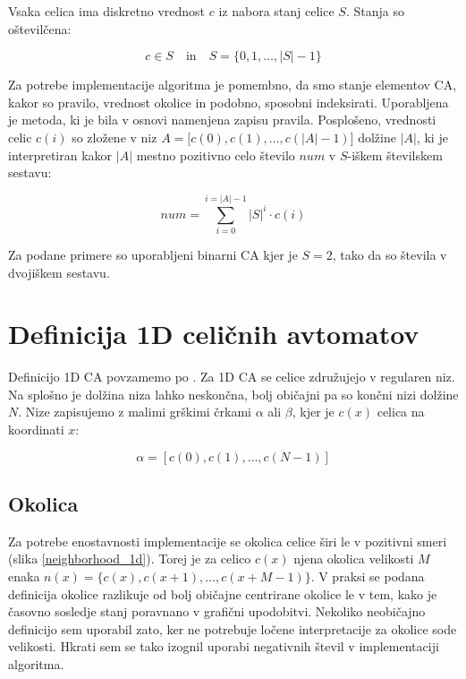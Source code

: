 \documentclass[12pt,a4paper,openany,twoside]{book}
\begin{document}
Vsaka celica ima diskretno vrednost \(c\) iz nabora stanj celice \(S\).
Stanja so oštevilčena:

\begin{equation}
c \in S
\quad \textrm{in} \quad
S = \{ 0, 1, \ldots, |S|-1 \}
\end{equation}

Za potrebe implementacije algoritma je pomembno,
da smo stanje elementov CA, kakor so pravilo, vrednost okolice in podobno,
sposobni indeksirati.
Uporabljena je metoda, ki je bila v osnovi namenjena zapisu pravila.
Posplošeno, vrednosti celic \(c(i)\) so zložene v niz \(A=[c(0),c(1), \ldots, c(|A|-1)\)] dolžine \(|A|\),
ki je interpretiran kakor \(|A|\) mestno pozitivno celo število \(num\) v
\(S\)-iškem številskem sestavu:

\begin{equation}
num = \sum_{i=0}^{i=|A|-1} |S|^i \cdot c(i)
\end{equation}

Za podane primere so uporabljeni binarni CA kjer je \(S=2\),
tako da so števila v dvojiškem sestavu.

\section{Definicija 1D celičnih avtomatov}

Definicijo 1D CA povzamemo po \cite{JerasDobnikar2007}.
Za 1D CA se celice združujejo v regularen niz.
Na splošno je dolžina niza lahko neskončna,
bolj običajni pa so končni nizi dolžine \(N\).
Nize zapisujemo z malimi grškimi črkami \(\alpha\) ali \(\beta\),
kjer je \(c(x)\) celica na koordinati \(x\):

\begin{equation}
\alpha = [c(0), c(1), \ldots, c(N-1)]
\end{equation}

\subsection{Okolica}

Za potrebe enostavnosti implementacije se okolica celice širi le v pozitivni smeri (slika \ref{neighborhood_1d}).
Torej je za celico \(c(x)\) njena okolica velikosti \(M\) enaka
\(n(x) = \{c(x), c(x+1), \ldots, c(x+M-1)\}\).
V praksi se podana definicija okolice razlikuje od
bolj običajne centrirane okolice le v tem,
kako je časovno sosledje stanj poravnano v grafični upodobitvi.
Nekoliko neobičajno definicijo sem uporabil zato,
ker ne potrebuje ločene interpretacije za okolice sode velikosti.
Hkrati sem se tako izognil uporabi negativnih števil v implementaciji algoritma.
\end{document}
